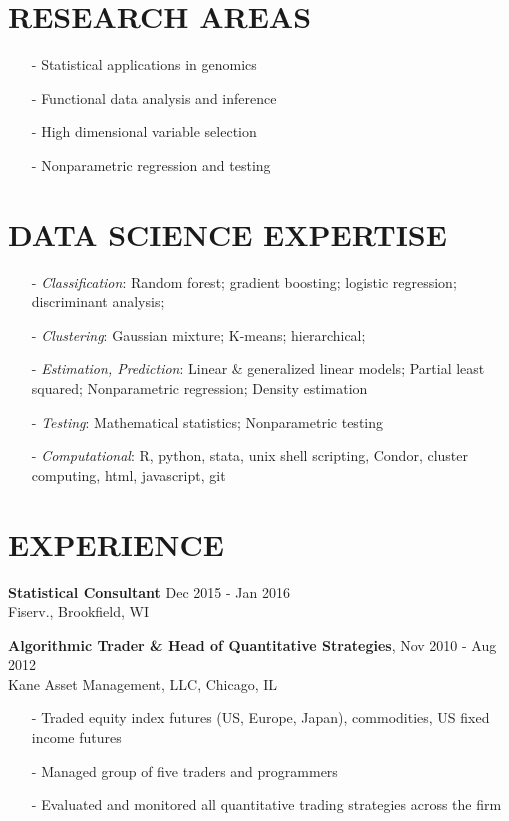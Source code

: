 \documentclass[11pt]{res} %
\begin{document}
\begin{resume}
\section{RESEARCH AREAS} 
\begin{itemize}[leftmargin=*] \itemsep -2pt %
\item[-]Statistical applications in genomics
\item[-]Functional data analysis and inference 
\item[-]High dimensional variable selection
\item[-]Nonparametric regression and testing
\end{itemize}

\section{DATA SCIENCE EXPERTISE} 
\begin{itemize}[leftmargin=*]
\item[-] {\emph{Classification}}: Random forest; gradient boosting; logistic regression; discriminant analysis;
\item[-] {\emph{Clustering}}: Gaussian mixture; K-means; hierarchical; 
\item[-] {\emph{Estimation, Prediction}}: Linear \& generalized linear models; Partial least squared; Nonparametric regression; Density estimation
\item[-] {\emph{Testing}}: Mathematical statistics; Nonparametric testing
\item[-] {\emph{Computational}}: R, python, stata, unix shell scripting, Condor, cluster computing, html, javascript, git
\end{itemize}

\section{EXPERIENCE} 
{\bf{Statistical Consultant}} \hfill Dec 2015 - Jan 2016 \\
Fiserv., Brookfield, WI

{\bf{Algorithmic Trader \& Head of Quantitative Strategies}}, \hfill Nov 2010 - Aug 2012 \\
Kane Asset Management, LLC, Chicago, IL
   \begin{itemize} \itemsep -2pt %
   \item[-] Traded equity index futures (US, Europe, Japan), commodities, US fixed income futures
   \item[-] Managed group of five traders and programmers
   \item[-] Evaluated and monitored all quantitative trading strategies across the firm
   \end{itemize}


\end{resume}
\end{document}
